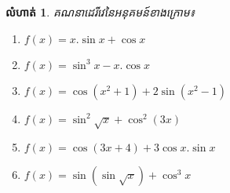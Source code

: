 \documentclass[a4paper,12pt]{article}
\newcommand{\kml}{\fontspec[Scale = 0.8333333334, Script=Khmer]{Khmer OS Muol Light}\selectfont}
\newtheorem{exercise}{\kml លំហាត់}
\begin{document}
\begin{enumerate}
 
 
\end{enumerate}

\begin{exercise}
គណនាដេរីវេនៃអនុគមន៍ខាងក្រោម៖
\begin{multicols}{2}
\begin{enumerate}
\item $f(x)=x.\sin x+\cos x$
\item $f(x)=\sin^3 x-x.\cos x$
\item $f(x)=\cos (x^2+1)+2\sin (x^2-1)$
\item $f(x)=\sin^2\sqrt{x}+\cos^2 (3x)$
\item $f(x)=\cos (3x+4)+3\cos x.\sin x$
\item $f(x)=\sin (\sin \sqrt{x})+\cos^3 x$
\end{enumerate}
\end{multicols}
\end{exercise}
\end{document}
